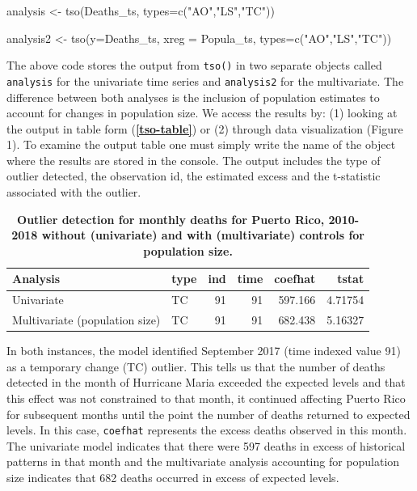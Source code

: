 \documentclass[12pt]{article}
\newenvironment{Shaded}{\begin{snugshade}}{\end{snugshade}}
\newcommand{\AttributeTok}[1]{\textcolor[rgb]{0.77,0.63,0.00}{#1}}
\newcommand{\FunctionTok}[1]{\textcolor[rgb]{0.00,0.00,0.00}{#1}}
\newcommand{\NormalTok}[1]{#1}
\newcommand{\OtherTok}[1]{\textcolor[rgb]{0.56,0.35,0.01}{#1}}
\newcommand{\StringTok}[1]{\textcolor[rgb]{0.31,0.60,0.02}{#1}}
\begin{document}
\begin{Shaded}
\begin{Highlighting}[numbers=left,,]
\NormalTok{analysis }\OtherTok{\textless{}{-}} \FunctionTok{tso}\NormalTok{(Deaths\_ts, }\AttributeTok{types=}\FunctionTok{c}\NormalTok{(}\StringTok{"AO"}\NormalTok{,}\StringTok{"LS"}\NormalTok{,}\StringTok{"TC"}\NormalTok{))}

\NormalTok{analysis2 }\OtherTok{\textless{}{-}} \FunctionTok{tso}\NormalTok{(}\AttributeTok{y=}\NormalTok{Deaths\_ts, }\AttributeTok{xreg =}\NormalTok{ Popula\_ts, }\AttributeTok{types=}\FunctionTok{c}\NormalTok{(}\StringTok{"AO"}\NormalTok{,}\StringTok{"LS"}\NormalTok{,}\StringTok{"TC"}\NormalTok{))}
\end{Highlighting}
\end{Shaded}

The above code stores the output from \texttt{tso()} in two separate
objects called \texttt{analysis} for the univariate time series and
\texttt{analysis2} for the multivariate. The difference between both
analyses is the inclusion of population estimates to account for changes
in population size. We access the results by: (1) looking at the output
in table form (\textbf{\autoref{tso-table}}) or (2) through data
visualization (Figure 1). To examine the output table one must simply
write the name of the object where the results are stored in the
console. The output includes the type of outlier detected, the
observation id, the estimated excess and the t-statistic associated with
the outlier.

\begin{longtable}[t]{llrrrr}
\caption{\label{tab:unnamed-chunk-12}\textbf{Outlier detection for monthly deaths for Puerto Rico, 2010-2018 without (univariate) and with (multivariate) controls for population size.} \label{tso-table}}\\
\toprule
Analysis & type & ind & time & coefhat & tstat\\
\midrule
Univariate & TC & 91 & 91 & 597.166 & 4.71754\\
Multivariate (population size) & TC & 91 & 91 & 682.438 & 5.16327\\
\bottomrule
\end{longtable}

In both instances, the model identified September 2017 (time indexed
value 91) as a temporary change (TC) outlier. This tells us that the
number of deaths detected in the month of Hurricane Maria exceeded the
expected levels and that this effect was not constrained to that month,
it continued affecting Puerto Rico for subsequent months until the point
the number of deaths returned to expected levels. In this case,
\texttt{coefhat} represents the excess deaths observed in this month.
The univariate model indicates that there were 597 deaths in excess of
historical patterns in that month and the multivariate analysis
accounting for population size indicates that 682 deaths occurred in
excess of expected levels.
\end{document}
